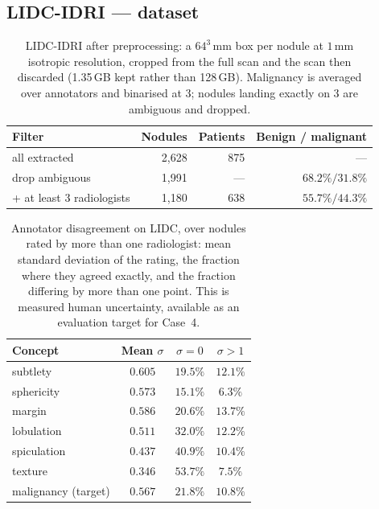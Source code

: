 \documentclass[11pt]{article}
\begin{document}
\subsection{LIDC-IDRI --- dataset}

\begin{table}[h]
\centering
\caption{LIDC-IDRI after preprocessing: a $64^3$\,mm box per nodule at $1$\,mm
isotropic resolution, cropped from the full scan and the scan then discarded
(1.35\,GB kept rather than 128\,GB). Malignancy is averaged over annotators and
binarised at $3$; nodules landing exactly on $3$ are ambiguous and dropped.}
\label{tab:app-lidc-data}
\begin{tabular}{lrrr}
\toprule
\textbf{Filter} & \textbf{Nodules} & \textbf{Patients} & \textbf{Benign / malignant} \\
\midrule
all extracted                    & 2{,}628 & 875 & --- \\
drop ambiguous                   & 1{,}991 & --- & $68.2\% / 31.8\%$ \\
\quad + at least 3 radiologists  & 1{,}180 & 638 & $55.7\% / 44.3\%$ \\
\bottomrule
\end{tabular}
\end{table}

\begin{table}[h]
\centering
\caption{Annotator disagreement on LIDC, over nodules rated by more than one
radiologist: mean standard deviation of the rating, the fraction where they
agreed exactly, and the fraction differing by more than one point. This is
measured human uncertainty, available as an evaluation target for Case~4.}
\label{tab:app-disagreement}
\begin{tabular}{lccc}
\toprule
\textbf{Concept} & \textbf{Mean $\sigma$} & \textbf{$\sigma = 0$} & \textbf{$\sigma > 1$} \\
\midrule
subtlety    & $0.605$ & $19.5\%$ & $12.1\%$ \\
sphericity  & $0.573$ & $15.1\%$ & $6.3\%$ \\
margin      & $0.586$ & $20.6\%$ & $13.7\%$ \\
lobulation  & $0.511$ & $32.0\%$ & $12.2\%$ \\
spiculation & $0.437$ & $40.9\%$ & $10.4\%$ \\
texture     & $0.346$ & $53.7\%$ & $7.5\%$ \\
\midrule
malignancy (target) & $0.567$ & $21.8\%$ & $10.8\%$ \\
\bottomrule
\end{tabular}
\end{table}
\end{document}

